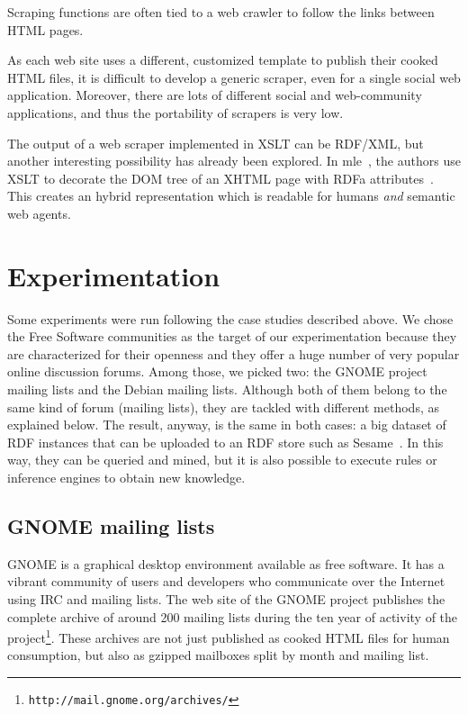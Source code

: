 \documentclass{../templates/www2008-submission}
\begin{document}
Scraping functions are often tied to a web crawler to follow the
links between HTML pages.

As each web site uses a different, customized template to
publish their cooked HTML files, it is
difficult to develop a generic scraper, even for a single social
web application. Moreover, there are lots of different social and
web-community applications, and thus the portability of scrapers
is very low.

The output of a web scraper implemented in XSLT can be RDF/XML, but
another interesting possibility has already been explored. In
mle~\cite{Hausenblas2007}, the authors use XSLT to decorate the
DOM tree of an XHTML page with RDFa attributes~\cite{Birbeck2006}.
This creates an hybrid representation which is readable for
humans \emph{and} semantic web agents.


\section{Experimentation}\label{sec:experimentation}

Some experiments were run following the case studies described above.
We chose the Free Software communities as the target of our
experimentation because they are characterized for their openness and
they offer a huge number of very popular online discussion forums.
Among those, we picked two: the GNOME project mailing lists and
the Debian mailing lists. Although both of them belong to the same
kind of forum (mailing lists), they are tackled with different methods,
as explained below. The result, anyway, is the same in both cases:
a big dataset of RDF instances that can be uploaded to an RDF
store such as Sesame~\cite{Broekstra2002}. In this way, they can be
queried and mined, but it is also possible to execute rules or
inference engines to obtain new knowledge.

\subsection{GNOME mailing lists}\label{sec:gnome}

GNOME is a graphical desktop environment available as free
software. It has a vibrant community of users and developers
who communicate over the Internet using IRC and mailing lists.
The web site of the GNOME project publishes the complete archive
of around 200 mailing lists during the ten year of activity of
the project\footnote{\texttt{http://mail.gnome.org/archives/}}.
These archives are not just published as cooked HTML files for
human consumption, but also as gzipped mailboxes split by
month and mailing list.
\end{document}
